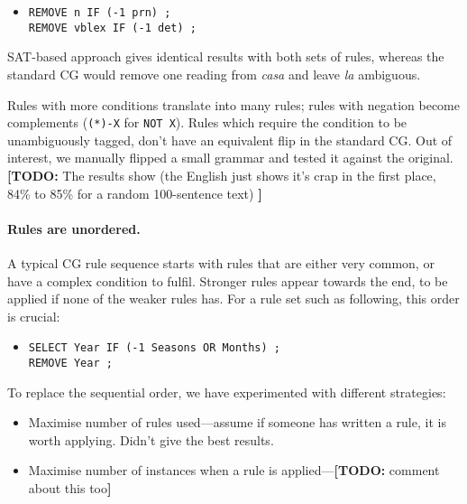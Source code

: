 \documentclass[11pt]{article}
\newcommand{\todo}[1]{{\color{cyan}\textbf{[TODO: }#1\textbf{]}}}
\begin{document}
\begin{itemize}
\item [] \texttt{REMOVE n IF (-1 prn) ;} \\
             \texttt{REMOVE vblex IF (-1 det) ;}
\end{itemize}

SAT-based approach gives identical results with both sets of rules,
whereas the standard CG would remove one reading from \emph{casa} and leave \emph{la} ambiguous.


Rules with more conditions translate into many rules; rules with negation become complements (\texttt{(*)-X} for \texttt{NOT X}). Rules which require the condition to be unambiguously tagged, don't have an equivalent flip in the standard CG.
Out of interest, we manually flipped a small grammar and tested it against the original.
\todo{The results show (the English just shows it's crap in the first place, 84\% to 85\% for a random 100-sentence text) }

\paragraph{Rules are unordered.}
A typical CG rule sequence starts with rules that are either very common, or have a complex condition to fulfil.
Stronger rules appear towards the end, to be applied if none of the weaker rules has. 
For a rule set such as following, this order is crucial:

\begin{itemize}
\item [] \texttt{SELECT Year IF (-1 Seasons OR Months) ;} \\
             \texttt{REMOVE Year ;}
\end{itemize}

To replace the sequential order, we have experimented with different strategies:
\begin{itemize}
\item Maximise number of rules used---assume if someone has written a rule, it is worth applying. Didn't give the best results.
\item Maximise number of instances when a rule is applied---\todo{comment about this too}
\end{itemize}
\end{document}

